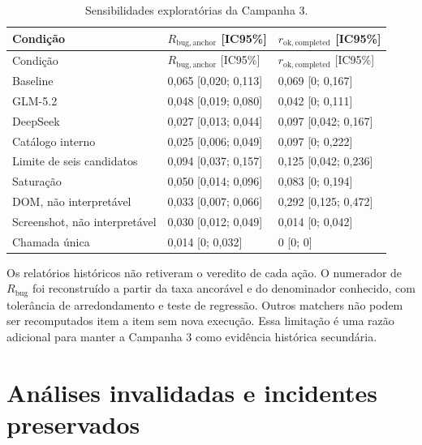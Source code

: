 \documentclass[11pt,a4paper]{article}
\newcommand{\Rbug}{\ensuremath{R_{\mathrm{bug}}}}
\newcommand{\Rbuganchor}{\ensuremath{R_{\mathrm{bug,anchor}}}}
\newcommand{\Rokcompleted}{\ensuremath{r_{\mathrm{ok,completed}}}}
\begin{document}
\begingroup
\footnotesize
\setlength{\tabcolsep}{3pt}
\begin{longtable}{@{}P{5.0cm}C{3.7cm}C{3.7cm}@{}}
\caption{Sensibilidades exploratórias da Campanha 3.}\label{tab:c3-sens}\\
\toprule
Condição & \Rbuganchor{} [IC95\%] & \Rokcompleted{} [IC95\%] \\
\midrule
\endfirsthead
\toprule
Condição & \Rbuganchor{} [IC95\%] & \Rokcompleted{} [IC95\%] \\
\midrule
\endhead
Baseline & 0,065 [0,020; 0,113] & 0,069 [0; 0,167] \\
GLM-5.2 & 0,048 [0,019; 0,080] & 0,042 [0; 0,111] \\
DeepSeek & 0,027 [0,013; 0,044] & 0,097 [0,042; 0,167] \\
Catálogo interno & 0,025 [0,006; 0,049] & 0,097 [0; 0,222] \\
Limite de seis candidatos & 0,094 [0,037; 0,157] & 0,125 [0,042; 0,236] \\
Saturação & 0,050 [0,014; 0,096] & 0,083 [0; 0,194] \\
DOM, não interpretável & 0,033 [0,007; 0,066] & 0,292 [0,125; 0,472] \\
Screenshot, não interpretável & 0,030 [0,012; 0,049] & 0,014 [0; 0,042] \\
Chamada única & 0,014 [0; 0,032] & 0 [0; 0] \\
\bottomrule
\end{longtable}
\endgroup

Os relatórios históricos não retiveram o veredito de cada ação. O numerador de \Rbug{} foi reconstruído a partir da taxa ancorável e do denominador conhecido, com tolerância de arredondamento e teste de regressão. Outros matchers não podem ser recomputados item a item sem nova execução. Essa limitação é uma razão adicional para manter a Campanha 3 como evidência histórica secundária.

\section{Análises invalidadas e incidentes preservados}
\end{document}
